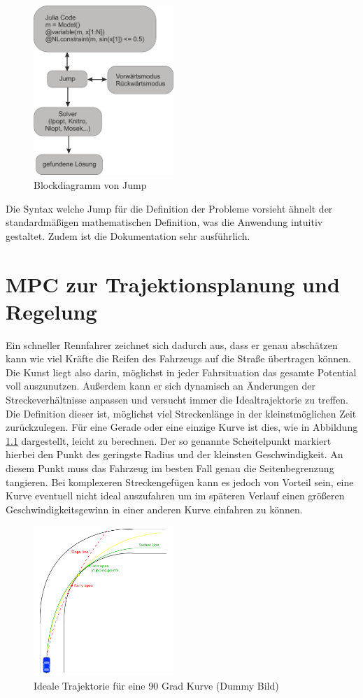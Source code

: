 \documentclass{like}
\begin{document}
\begin{figure}[ht!]
	\centering
	\includegraphics[width=150pt]{Abbildungen/jumpDiagram.png}
	\caption{Blockdiagramm von Jump}
	\label{fig:jumpDiagram}
\end{figure}

Die Syntax welche Jump für die Definition der Probleme vorsieht ähnelt der standardmäßigen mathematischen Definition, was die Anwendung intuitiv gestaltet. Zudem ist die Dokumentation sehr ausführlich.


\chapter{MPC zur Trajektionsplanung und Regelung}

Ein schneller Rennfahrer zeichnet sich dadurch aus, dass er genau abschätzen kann wie viel Kräfte die Reifen des Fahrzeugs auf die Straße übertragen können. Die Kunst liegt also darin, möglichst in jeder Fahrsituation das gesamte Potential voll auszunutzen. Außerdem kann er sich dynamisch an Änderungen der Streckeverhältnisse anpassen und versucht immer die Idealtrajektorie zu treffen. Die Definition dieser ist, möglichst viel Streckenlänge in der kleinstmöglichen Zeit zurückzulegen. Für eine Gerade oder eine einzige Kurve ist dies, wie in Abbildung \ref{fig:idealTrajektorie} dargestellt, leicht zu berechnen. Der so genannte Scheitelpunkt markiert hierbei den Punkt des geringste Radius und der kleinsten Geschwindigkeit. An diesem Punkt muss das Fahrzeug im besten Fall genau die Seitenbegrenzung tangieren. 
Bei komplexeren Streckengefügen kann es jedoch von Vorteil sein, eine Kurve eventuell nicht ideal auszufahren um im späteren Verlauf einen größeren Geschwindigkeitsgewinn in einer anderen Kurve einfahren zu können.

\begin{figure}[ht!]
	\centering
	\includegraphics[width=150pt]{Abbildungen/idealTrajektorie.png}
	\caption{Ideale Trajektorie für eine 90 Grad Kurve (Dummy Bild)}
	\label{fig:idealTrajektorie}
\end{figure}
\end{document}
